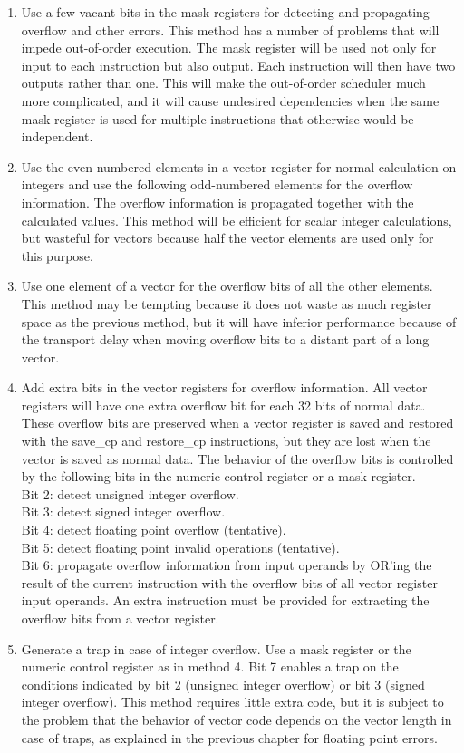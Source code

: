 \documentclass[forwardcom.tex]{subfiles}
\begin{document}
\begin{enumerate}
\item Use a few vacant bits in the mask registers for detecting and propagating overflow and other errors. This method has a number of problems that will impede out-of-order execution. The mask register will be used not only for input to each instruction but also output. Each instruction will then have two outputs rather than one. This will make the out-of-order scheduler much more complicated, and it will cause undesired dependencies when the same mask register is used for multiple instructions that otherwise would be independent.

\item Use the even-numbered elements in a vector register for normal calculation on integers 
and use the following odd-numbered elements for the overflow information. The overflow
information is propagated together with the calculated values. 
This method will be efficient for scalar integer calculations, but wasteful for vectors because half the vector elements are used only for this purpose. 

\item Use one element of a vector for the overflow bits of all the other elements. This method may be tempting because it does not waste as much register space as the previous method, but it will have inferior performance because of the transport delay when moving overflow bits to a distant part of a long vector.

\item Add extra bits in the vector registers for overflow information. All vector registers will have one extra overflow bit for each 32 bits of normal data. These overflow bits are preserved when a vector register is saved and restored with the save\_cp and restore\_cp instructions, but they are lost when the vector is saved as normal data. The behavior of the overflow bits is controlled by the following bits in the numeric control register or a mask register. \\
Bit 2: detect unsigned integer overflow. \\
Bit 3: detect signed integer overflow. \\
Bit 4: detect floating point overflow (tentative). \\
Bit 5: detect floating point invalid operations (tentative). \\
Bit 6: propagate overflow information from input operands by OR'ing the result of the current instruction with the overflow bits of all vector register input operands. 
An extra instruction must be provided for extracting the overflow bits from a vector register.

\item Generate a trap in case of integer overflow. Use a mask register or the numeric control register as in method 4. Bit 7 enables a trap on the conditions indicated by bit 2 (unsigned integer overflow) or bit 3 (signed integer overflow). This method requires little extra code, but it is subject to the problem that the behavior of vector code depends on the vector length in case of traps, as explained in the previous chapter for floating point errors.
\end{enumerate}
\end{document}
